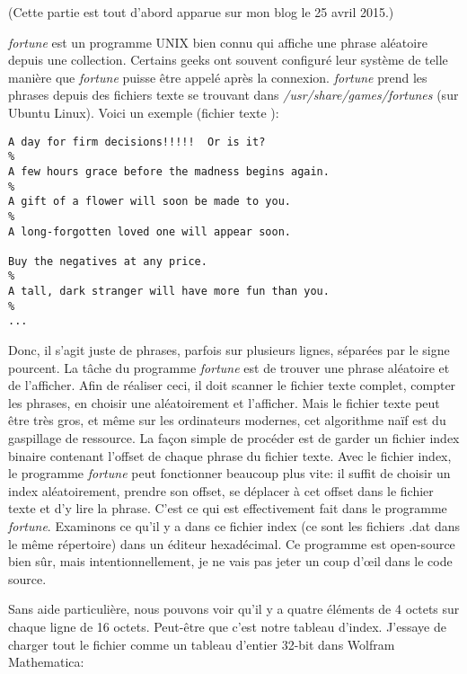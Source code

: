 
(Cette partie est tout d'abord apparue sur mon blog le 25 avril 2015.)

\emph{fortune} est un programme UNIX bien connu qui affiche une phrase aléatoire depuis
une collection.
Certains geeks ont souvent configuré leur système de telle manière que \emph{fortune}
puisse être appelé après la connexion.
\emph{fortune} prend les phrases depuis des fichiers texte se trouvant dans \emph{/usr/share/games/fortunes}
(sur Ubuntu Linux).
Voici un exemple (fichier texte ):

\begin{lstlisting}
A day for firm decisions!!!!!  Or is it?
%
A few hours grace before the madness begins again.
%
A gift of a flower will soon be made to you.
%
A long-forgotten loved one will appear soon.

Buy the negatives at any price.
%
A tall, dark stranger will have more fun than you.
%
...
\end{lstlisting}

Donc, il s'agit juste de phrases, parfois sur plusieurs lignes, séparées par le
signe pourcent.
La tâche du programme \emph{fortune} est de trouver une phrase aléatoire et de l'afficher.
Afin de réaliser ceci, il doit scanner le fichier texte complet, compter les phrases,
en choisir une aléatoirement et l'afficher.
Mais le fichier texte peut être très gros, et même sur les ordinateurs modernes, cet
algorithme naïf est du gaspillage de ressource.
La façon simple de procéder est de garder un fichier index binaire contenant l'offset
de chaque phrase du fichier texte.
Avec le fichier index, le programme \emph{fortune} peut fonctionner beaucoup plus vite:
il suffit de choisir un index aléatoirement, prendre son offset, se déplacer à cet
offset dans le fichier texte et d'y lire la phrase.
C'est ce qui est effectivement fait dans le programme \emph{fortune}.
Examinons ce qu'il y a dans ce fichier index (ce sont les fichiers .dat dans le même
répertoire) dans un éditeur hexadécimal.
Ce programme est open-source bien sûr, mais intentionnellement, je ne vais pas jeter
un coup d'\oe{}il dans le code source.



Sans aide particulière, nous pouvons voir qu'il y a quatre éléments de 4 octets sur
chaque ligne de 16 octets.
Peut-être que c'est notre tableau d'index.
J'essaye de charger tout le fichier comme un tableau d'entier 32-bit dans Wolfram
Mathematica:

